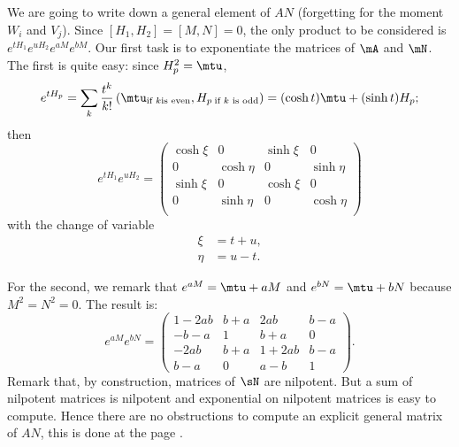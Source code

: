 \label{pg:exp_AN}
We are going to write down a general element of $AN$ (forgetting for the moment $W_i$ and $V_j$). Since $[H_1,H_2]=[M,N]=0$, the only product to be considered is $e^{tH_1}e^{uH_2}e^{aM}e^{bM}$.  Our first task is to exponentiate the matrices of $\mA$ and $\mN$. The first is quite easy: since $H_p^2=\mtu$,
\[
	e^{tH_p}=\sum_k\frac{t^k}{k!}\left(  \mtu_{\text{if }k \text{is even}}, {H_p}\,_{\text{if $k$ is odd}}  \right)
	=(\cosh t)\mtu+(\sinh t)H_p;
\]
then
\begin{equation}
	e^{tH_1}e^{uH_2}=\begin{pmatrix}
		\cosh\xi & 0         & \sinh\xi & 0         \\
		0        & \cosh\eta & 0        & \sinh\eta \\
		\sinh\xi & 0         & \cosh\xi & 0         \\
		0        & \sinh\eta & 0        & \cosh\eta \\
	\end{pmatrix}
\end{equation}
with the change of variable
\begin{subequations}\label{eq:chm_xi_eta}
	\begin{align}
		\xi  & =t+u, \\
		\eta & =u-t.
	\end{align}
\end{subequations}

For the second, we remark that $e^{aM}=\mtu+aM$ and $e^{bN}=\mtu+bN$ because $M^2=N^2=0$. The result is:
\begin{equation}
	e^{aM}e^{bN}=\begin{pmatrix}
		1-2ab & b+a & 2ab   & b-a \\
		-b-a  & 1   & b+a   & 0   \\
		-2ab  & b+a & 1+2ab & b-a \\
		b-a   & 0   & a-b   & 1
	\end{pmatrix}.
\end{equation}
Remark that, by construction, matrices of $\sN$ are nilpotent. But a sum of nilpotent matrices is nilpotent and exponential on nilpotent matrices is easy to compute. Hence there are no obstructions to compute an explicit general matrix of $AN$, this is done at the page \pageref{PgExplAN}.

